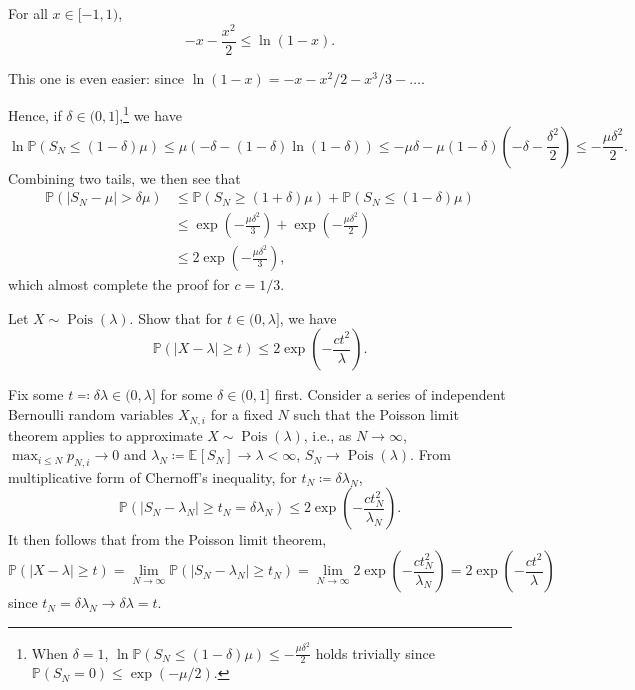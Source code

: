 \begin{answer}
	\begin{claim}
		For all \(x \in [-1, 1)\),
		\[
			-x - \frac{x^2}{2} \leq \ln (1 - x).
		\]
	\end{claim}
	\begin{explanation}
		This one is even easier: since \(\ln (1 - x) = -x - x^2 / 2 - x^3 / 3 - \dots \).
	\end{explanation}

	Hence, if \(\delta \in (0, 1]\),\footnote{When \(\delta = 1\), \(\ln \mathbb{P} (S_N \leq (1 - \delta )\mu ) \leq - \frac{\mu \delta ^2}{2}\) holds trivially since \(\mathbb{P} (S_N = 0) \leq \exp (- \mu / 2)\).} we have
	\[
		\ln \mathbb{P} (S_N \leq (1-\delta )\mu )
		\leq \mu (-\delta -(1-\delta )\ln (1-\delta ))
		\leq - \mu \delta - \mu (1-\delta ) \left( -\delta - \frac{\delta^2}{2} \right)
		\leq - \frac{\mu \delta ^2}{2}.
	\]
	Combining two tails, we then see that
	\[
		\begin{split}
			\mathbb{P} (\vert S_N - \mu \vert > \delta \mu )
			 & \leq \mathbb{P} (S_N \geq (1 + \delta )\mu ) + \mathbb{P} (S_N \leq (1 - \delta )\mu ) \\
			 & \leq \exp (- \frac{\mu \delta ^2}{3}) + \exp (- \frac{\mu \delta ^2}{2})               \\
			 & \leq 2 \exp (- \frac{\mu \delta ^2}{3}),
		\end{split}
	\]
	which almost complete the proof for \(c = 1 / 3\).
\end{answer}

\begin{problem*}[Exercise 2.3.6]\label{ex2.3.6}
	Let \(X \sim \operatorname{Pois}(\lambda ) \). Show that for \(t \in (0, \lambda ]\), we have
	\[
		\mathbb{P} (\lvert X - \lambda \rvert \geq t)
		\leq 2 \exp (- \frac{ct^2}{\lambda }).
	\]
\end{problem*}
\begin{answer}
	Fix some \(t \eqqcolon \delta \lambda \in (0, \lambda ]\) for some \(\delta \in (0, 1]\) first. Consider a series of independent Bernoulli random variables \(X_{N, i}\) for a fixed \(N\) such that the Poisson limit theorem applies to approximate \(X \sim \operatorname{Pois}(\lambda ) \), i.e., as \(N \to \infty \), \(\max _{i \leq N} p_{N, i} \to 0\) and \(\lambda _N \coloneqq \mathbb{E}_{}\left[S_N \right] \to \lambda < \infty \), \(S_N \to \operatorname{Pois}(\lambda ) \). From multiplicative form of Chernoff's inequality, for \(t_N \coloneqq \delta \lambda _N\),
	\[
		\mathbb{P} (\vert S_N - \lambda _N \vert \geq t_N = \delta \lambda _N)
		\leq 2 \exp ( - \frac{c t_N^2}{\lambda _N}).
	\]
	It then follows that from the Poisson limit theorem,
	\[
		\mathbb{P} (\vert X - \lambda  \vert \geq t)
		= \lim_{N \to \infty} \mathbb{P} (\vert S_N - \lambda _N \vert \geq t_N)
		= \lim_{N \to \infty} 2 \exp (- \frac{c t^2_N}{\lambda _N})
		= 2 \exp (- \frac{c t^2}{\lambda })
	\]
	since \(t_N = \delta \lambda _N \to \delta \lambda = t\).
\end{answer}

